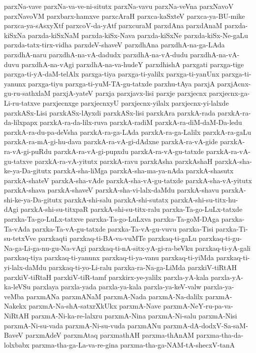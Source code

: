 {parxNa-vave
parxNa-va-ve-ni-situtx
parxNa-vavu
parxNa-veVna
parxNavoV
parxNavoVM
parxbarx-hamxve
parxcAraH
parxca-kaSxteV
parxca-ya-BU-mike
parxca-ya-sAsxyXtf
parxcoV-da-yAtf
parxcuraM
parxdAna
parxdAnaM
parxda-kiSxNa
parxda-kiSxNaM
parxda-kiSx-Nava
parxda-kiSxNe
parxda-kiSx-Ne-gaLu
parxda-tatx-tirx-vidha
parxdeV-shaveV
parxdhAna
parxdhA-na-ga-LAda
parxdhA-naru
parxdhA-na-vA-dadudx
parxdhA-na-vA-dudu
parxdhA-na-vA-duvu
parxdhA-na-vAgi
parxdhA-na-va-hudeY
parxdhishA
parxgati
parxga-tige
parxga-ti-yA-daM-telAlx
parxga-tiya
parxga-ti-yalilx
parxga-ti-yanUnx
parxga-ti-yanunx
parxga-tiyu
parxga-ti-yuM-TA-gu-tatxde
parxhu-tAya
parxjA
parxjAcnx-gu-ru-sathxlaM
parxjA-yateV
parxja
parxjavx-lisi
parxje
parxjecnx
parxjecnx-ga-Li-ru-tatxve
parxjecnxge
parxjecnxyU
parxjecnx-yilalx
parxjecnx-yi-lalxde
parxkASx-Lisi
parxkASx-lAyxdi
parxkASx-lisi
parxkAra
parxkA-rada
parxkA-ra-da-lilxpapx
parxkA-ra-da-lilx-ruva
parxkA-radiM
parxkA-ra-diM-daM-Da-ledu
parxkA-ra-du-pa-deVsha
parxkA-ra-ga-LAda
parxkA-ra-ga-Lalilx
parxkA-ra-gaLu
parxkA-ra-mA-gi-hu-dava
parxkA-ra-vA-gi-dAdxne
parxkA-ra-vA-gide
parxkA-ra-vA-gi-puRdu
parxkA-ra-vA-gi-pupxdu
parxkA-ra-vA-gu-tatxde
parxkA-ra-vA-gu-tatxve
parxkA-ra-vA-yitutx
parxkA-ravu
parxkAsha
parxkAshaH
parxkA-sha-ke-ya-Da-gitutx
parxkA-sha-liMga
parxkA-sha-ma-ya-nAda
parxkA-shasutx
parxkA-shateV
parxkA-sha-vAde
parxkA-sha-vA-gu-tatxde
parxkA-sha-vA-yitutx
parxkA-shava
parxkA-shaveV
parxkA-sha-vi-lalx-daMdu
parxkA-shavu
parxkA-shi-ke-ya-Da-gitutx
parxkA-shi-salu
parxkA-shi-sutatx
parxkA-shi-su-titx-hu-dAgi
parxkA-shi-su-titxpaR
parxkA-shi-su-titx-ralu
parxka-Ta-go-LuLx-tatxde
parxka-Ta-go-LuLx-tatxve
parxka-Ta-go-LuLxva
parxka-Ta-goM-DAga
parxka-Ta-vAda
parxka-Ta-vA-gu-tatxde
parxka-Ta-vA-gu-vuvu
parxka-Tisi
parxka-Ti-su-tetxVve
parxkaqti
parxkaq-ti-BA-va-vuMTe
parxkaq-ti-gaLu
parxkaq-ti-gu-Na-ga-Li-ga-nu-gu-Na-vAgi
parxkaq-ti-nA-sitx-yA-gi-ra-beVku
parxkaq-ti-yA-gali
parxkaq-tiya
parxkaq-ti-yanunx
parxkaq-ti-ya-vanu
parxkaq-ti-yiMda
parxkaq-ti-yi-lalx-daMdu
parxkaq-ti-yo-Li-ralu
parxka-ra-Na-ga-LiMda
parxkiV-tiRtAH
parxkiV-tiRtaH
parxkiV-tiR-tamf
parxkirx-ye-yalilx
parxla-yA-kala
parxla-yA-ka-leVSu
parxlaya
parxla-yada
parxla-ya-kala
parxla-ya-keV-valw
parxla-ya-veMba
parxmANa
parxmANaM
parxmA-Nada
parxmA-Na-dalilx
parxmA-Nakekx
parxmA-Na-shA-satxrXkUkx
parxmA-Nave
parxmA-NeY-ru-pa-va-NiRtAH
parxmA-Ni-ka-re-lalxru
parxmA-Nina
parxmA-Ni-salu
parxmA-Nisi
parxmA-Ni-su-vada
parxmA-Ni-su-vuda
parxmANu
parxmA-dA-dodxV-Sa-saM-BaveV
parxmAdeV
parxmAtaq
parxmathAH
parxma-thAnAM
parxma-tha-da-lolxbabx
parxma-tha-ga-La-va-re-gina
parxma-tha-ga-NAM-tA-shecxV-tanA
}
